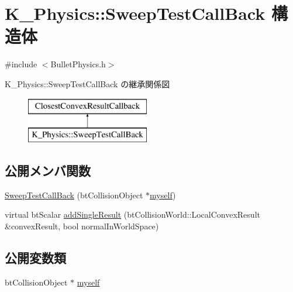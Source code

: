 \hypertarget{struct_k___physics_1_1_sweep_test_call_back}{}\section{K\+\_\+\+Physics\+:\+:Sweep\+Test\+Call\+Back 構造体}
\label{struct_k___physics_1_1_sweep_test_call_back}


{\ttfamily \#include $<$Bullet\+Physics.\+h$>$}

K\+\_\+\+Physics\+:\+:Sweep\+Test\+Call\+Back の継承関係図\begin{figure}[H]
\begin{center}
\leavevmode
\includegraphics[height=2.000000cm]{struct_k___physics_1_1_sweep_test_call_back}
\end{center}
\end{figure}
\subsection*{公開メンバ関数}
\begin{DoxyCompactItemize}
\item 
\mbox{\hyperlink{struct_k___physics_1_1_sweep_test_call_back_ae8598d49a8cfdd4d2a9ed29c70db6f49}{Sweep\+Test\+Call\+Back}} (bt\+Collision\+Object $\ast$\mbox{\hyperlink{struct_k___physics_1_1_sweep_test_call_back_a54d36f38158c77a8aeca7aa015d255b5}{myself}})
\item 
virtual bt\+Scalar \mbox{\hyperlink{struct_k___physics_1_1_sweep_test_call_back_a1832e2d592d2161787bfc22377069446}{add\+Single\+Result}} (bt\+Collision\+World\+::\+Local\+Convex\+Result \&convex\+Result, bool normal\+In\+World\+Space)
\end{DoxyCompactItemize}
\subsection*{公開変数類}
\begin{DoxyCompactItemize}
\item 
bt\+Collision\+Object $\ast$ \mbox{\hyperlink{struct_k___physics_1_1_sweep_test_call_back_a54d36f38158c77a8aeca7aa015d255b5}{myself}}
\end{DoxyCompactItemize}


